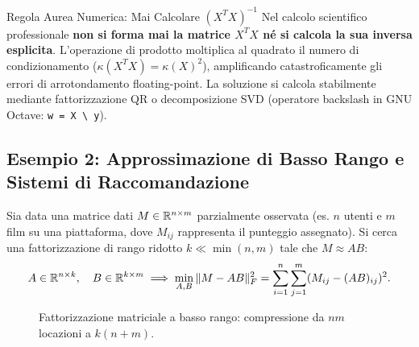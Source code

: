 \begin{alertblock}{Regola Aurea Numerica: Mai Calcolare $(X^T X)^{-1}$}
\label{rem:regola-aurea-normal-equations}
Nel calcolo scientifico professionale \textbf{non si forma mai la matrice $X^T X$ n\'e si calcola la sua inversa esplicita}. L'operazione di prodotto moltiplica al quadrato il numero di condizionamento ($\kappa(X^T X) = \kappa(X)^2$), amplificando catastroficamente gli errori di arrotondamento floating-point. La soluzione si calcola stabilmente mediante fattorizzazione QR o decomposizione SVD (operatore backslash in GNU Octave: \texttt{w = X \textbackslash\ y}).
\end{alertblock}

\subsection{Esempio 2: Approssimazione di Basso Rango e Sistemi di Raccomandazione}
Sia data una matrice dati $M \in \mathbb{R}^{n \times m}$ parzialmente osservata (es. $n$ utenti e $m$ film su una piattaforma, dove $M_{ij}$ rappresenta il punteggio assegnato). Si cerca una fattorizzazione di rango ridotto $k \ll \min(n, m)$ tale che $M \approx AB$:
\begin{equation}
    A \in \mathbb{R}^{n \times k}, \quad B \in \mathbb{R}^{k \times m} \implies \min_{A, B} \|M - AB\|_F^2 = \sum_{i=1}^n \sum_{j=1}^m (M_{ij} - (AB)_{ij})^2.
\end{equation}

\begin{figure}[H]
\centering
{}
\caption{Fattorizzazione matriciale a basso rango: compressione da $nm$ locazioni a $k(n + m)$.}
\label{fig:low-rank-matrix}
\end{figure}

